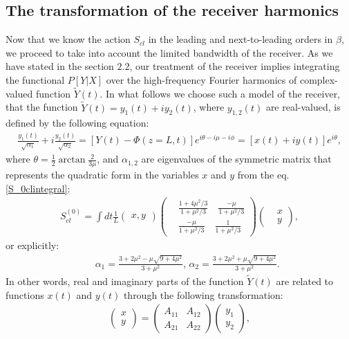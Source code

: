 \documentclass{article}
\begin{document}
\subsection{The transformation of the receiver harmonics}

Now that we know the action $S_{cl}$ in the leading and next-to-leading orders in $\beta$, we proceed to take into account the limited bandwidth of the receiver. As we have stated in the section $2.2$, our treatment of the receiver implies integrating the functional $P[Y|X]$ over the high-frequency Fourier harmonics of complex-valued function $\tilde{Y}(t)$. In what follows we choose such a model of the receiver, that the function $\tilde{Y}(t) = y_{1}(t)+iy_{2}(t)$, where $y_{1,2}(t)$ are real-valued, is defined by the following equation: 
\begin{eqnarray}\label{subsYtildeY}
    \frac{y_{1}(t)}{\sqrt{\alpha_{1}}} + i\frac{y_{2}(t)}{\sqrt{\alpha_{2}}} = [Y(t)-\Phi(z=L,t)]e^{i\theta - i\mu - i\phi} = [x(t)+iy(t)]e^{i\theta},
\end{eqnarray}
where $\theta = \frac{1}{2}\arctan{\frac{2}{3\mu}}$, and $\alpha_{1, 2}$ are eigenvalues of the symmetric matrix that represents the quadratic form in the variables $x$ and $y$ from the eq. \eqref{S_0clintegral}: 
\begin{eqnarray}
    S_{cl}^{(0)} = \int dt \frac{1}{L}
    \begin{pmatrix}
        x, y
    \end{pmatrix}
    \begin{pmatrix}
        &\!\!\!\!\frac{1+4\mu^{2}/3}{1+\mu^{2}/3} \quad \frac{-\mu}{1+\mu^{2}/3}\\
        &\!\!\!\!\frac{-\mu}{1+\mu^{2}/3} \quad \frac{1}{1+\mu^{2}/3}
    \end{pmatrix}
    \begin{pmatrix}
        &\!\!\!\!\!\!x\\
        &\!\!\!\!\!\!y
    \end{pmatrix},
\end{eqnarray}
or explicitly: 
\begin{eqnarray}\label{alphaformula}
    &&\alpha_{1} = \frac{3+2\mu^{2}-\mu\sqrt{9+4\mu^{2}}}{3+\mu^{2}},\,\alpha_{2} = \frac{3+2\mu^{2}+\mu\sqrt{9+4\mu^{2}}}{3+\mu^{2}}\label{alphaformula2}.
\end{eqnarray}
In other words, real and imaginary parts of the function $\tilde{Y}(t)$ are related to functions $x(t)$ and $y(t)$ through the following transformation:
\begin{eqnarray}
    \begin{pmatrix}
        x\\
        y
    \end{pmatrix}
    =
    \begin{pmatrix}
        A_{11} & A_{12}\\
        A_{21} & A_{22}
    \end{pmatrix}
    \begin{pmatrix}
    y_{1}\\
    y_{2}
    \end{pmatrix},
\end{eqnarray}
\end{document}

